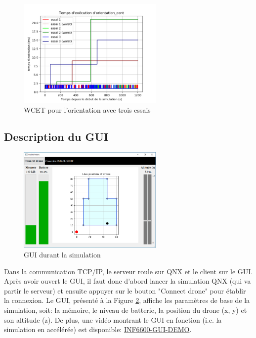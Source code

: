 \documentclass[journal]{IEEEtran}
\begin{document}
\begin{figure}
	\centering
	\captionsetup{justification=centering}
	\includegraphics[width=200pt]{orientation_cont.png}
	\caption{WCET pour l'orientation avec trois essais}
	\label{fig:perfoOrientation}
\end{figure}

\subsection{Description du GUI}

\begin{figure}
	\centering
	\captionsetup{justification=centering}
	\includegraphics[width=200pt]{GUI_image.png}
	\caption{GUI durant la simulation}
	\label{fig:GUI}
\end{figure}

Dans la communication TCP/IP, le serveur roule sur QNX et le client sur le GUI. Après avoir ouvert le GUI, il faut donc d'abord lancer la simulation QNX (qui va partir le serveur) et ensuite appuyer sur le bouton "Connect drone" pour établir la connexion. Le GUI, présenté à la Figure \ref{fig:GUI}, affiche les paramètres de base de la simulation, soit: la mémoire, le niveau de batterie, la position du drone (x, y) et son altitude (z). De plus, une vidéo montrant le GUI en fonction (i.e. la simulation en accélérée) est disponible: \href{https://drive.google.com/file/d/1W9yt0Z4YxCwr0TjXkgv12WVO9TSmWGtv/view?usp=sharing}{{\color{blue}INF6600-GUI-DEMO}}\cite{ref:video}.
\end{document}
